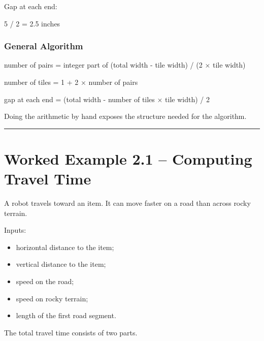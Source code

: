 \documentclass[
]{article}
\newenvironment{Shaded}{\begin{snugshade}}{\end{snugshade}}
\newcommand{\NormalTok}[1]{#1}
\providecommand{\tightlist}{%
  \setlength{\itemsep}{0pt}\setlength{\parskip}{0pt}}
\begin{document}
Gap at each end:

\begin{Shaded}
\begin{Highlighting}[]
\NormalTok{5 / 2 = 2.5 inches}
\end{Highlighting}
\end{Shaded}

\subsubsection{General Algorithm}\label{general-algorithm}

\begin{Shaded}
\begin{Highlighting}[]
\NormalTok{number of pairs = integer part of}
\NormalTok{                  (total width {-} tile width) / (2 × tile width)}

\NormalTok{number of tiles = 1 + 2 × number of pairs}

\NormalTok{gap at each end =}
\NormalTok{    (total width {-} number of tiles × tile width) / 2}
\end{Highlighting}
\end{Shaded}

Doing the arithmetic by hand exposes the structure needed for the
algorithm.

\begin{center}\rule{0.5\linewidth}{0.5pt}\end{center}

\section{Worked Example 2.1 -- Computing Travel
Time}\label{worked-example-2.1-computing-travel-time}

A robot travels toward an item. It can move faster on a road than across
rocky terrain.

Inputs:

\begin{itemize}
\tightlist
\item
  horizontal distance to the item;
\item
  vertical distance to the item;
\item
  speed on the road;
\item
  speed on rocky terrain;
\item
  length of the first road segment.
\end{itemize}

The total travel time consists of two parts.
\end{document}
